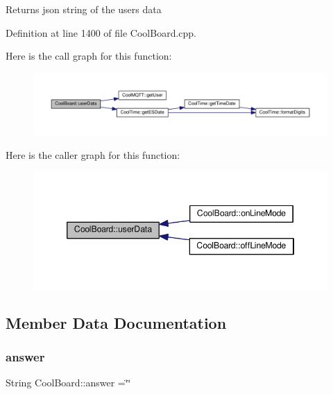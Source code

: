 \begin{DoxyReturn}{Returns}
json string of the user\textquotesingle{}s data 
\end{DoxyReturn}


Definition at line 1400 of file Cool\+Board.\+cpp.

Here is the call graph for this function\+:
\nopagebreak
\begin{figure}[H]
\begin{center}
\leavevmode
\includegraphics[width=350pt]{class_cool_board_ae7358fb6e623cfc81b775f5f1734909b_cgraph}
\end{center}
\end{figure}
Here is the caller graph for this function\+:
\nopagebreak
\begin{figure}[H]
\begin{center}
\leavevmode
\includegraphics[width=346pt]{class_cool_board_ae7358fb6e623cfc81b775f5f1734909b_icgraph}
\end{center}
\end{figure}


\subsection{Member Data Documentation}
\mbox{\label{class_cool_board_a7b835fafd449e5282f7f91d787a2dc15}} 
\subsubsection{\texorpdfstring{answer}{answer}}
{\footnotesize\ttfamily String Cool\+Board\+::answer =\char`\"{}\char`\"{}\hspace{0.3cm}{\ttfamily [private]}}

